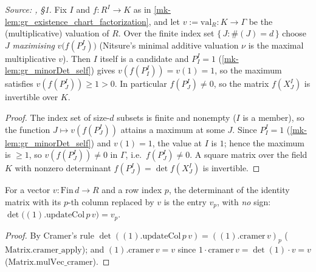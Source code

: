 \begin{lemma}\label{mk-lem:gr_existence_minimal_valuation}
  \leanok

  \textit{Source: \cite{nitsure-hilbert-quot}, \S 1.}
  Fix \(I\) and \(f : R^I \to K\) as in \ref{mk-lem:gr_existence_chart_factorization},
  and let \(v := \mathrm{val}_R : K \to \Gamma\) be the (multiplicative) valuation
  of \(R\). Over the finite index set \(\{\, J : \#(J) = d \,\}\) choose \(J\)
  \emph{maximising} \(v\bigl(f(P^I_J)\bigr)\) (Nitsure's minimal additive valuation
  \(\nu\) is the maximal multiplicative \(v\)). Then \(I\) itself is a candidate and
  \(P^I_I = 1\) (\ref{mk-lem:gr_minorDet_self}) gives \(v(f(P^I_I)) = v(1) = 1\), so
  the maximum satisfies \(v(f(P^I_J)) \ge 1 > 0\). In particular \(f(P^I_J) \ne 0\),
  so the matrix \(f(X^I_J)\) is invertible over \(K\).
\end{lemma}
\begin{proof}
  \leanok
  The index set of size-\(d\) subsets is finite and nonempty (\(I\) is a member),
  so the function \(J \mapsto v(f(P^I_J))\) attains a maximum at some \(J\). Since
  \(P^I_I = 1\) (\ref{mk-lem:gr_minorDet_self}) and \(v(1) = 1\), the value at \(I\)
  is \(1\); hence the maximum is \(\ge 1\), so \(v(f(P^I_J)) \ne 0\) in \(\Gamma\),
  i.e.\ \(f(P^I_J) \ne 0\). A square matrix over the field \(K\) with nonzero
  determinant \(f(P^I_J) = \det f(X^I_J)\) is invertible.
\end{proof}

\begin{lemma}\label{mk-lem:gr_det_one_updateCol}
  \leanok

  For a vector \(v : \mathrm{Fin}\,d \to R\) and a row index \(p\), the determinant of the identity
  matrix with its \(p\)-th column replaced by \(v\) is the entry \(v_p\), with \emph{no} sign:
  \(\det\bigl((1).\mathrm{updateCol}\,p\,v\bigr) = v_p\).
\end{lemma}
\begin{proof}
  \leanok

By Cramer's rule \(\det((1).\mathrm{updateCol}\,p\,v) = ((1).\mathrm{cramer}\,v)_p\)
  (\(\mathrm{Matrix.cramer\_apply}\)); and \((1).\mathrm{cramer}\,v = v\) since
  \(\mathrm{1}\cdot\mathrm{cramer}\,v = \det(1)\cdot v = v\) (\(\mathrm{Matrix.mulVec\_cramer}\)).

\end{proof}

